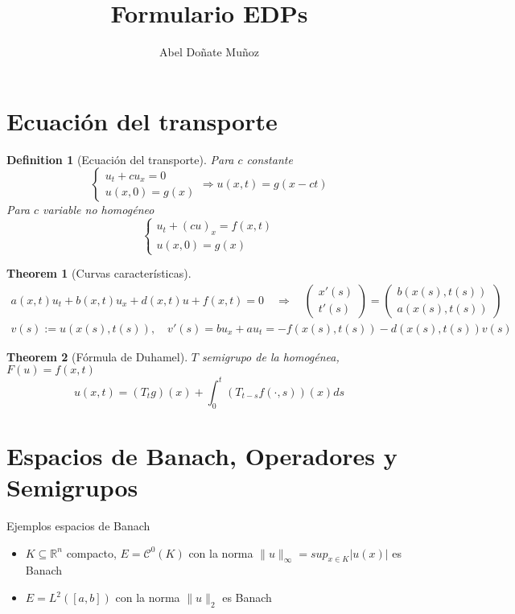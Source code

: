 \documentclass[leqno]{article}
\title{Formulario EDPs}
\author{Abel Doñate Muñoz}
\date{}
\newtheorem*{theorem}{Theorem}
\newtheorem*{definition}{Definition}
\begin{document}
\maketitle
\tableofcontents
\newpage

\section{Ecuación del transporte}

\begin{definition}[Ecuación del transporte]
Para $c$ constante
\[
\begin{cases}
  u_t+cu_x = 0\\ 
  u(x, 0)=g(x)
\end{cases} \Rightarrow u(x,t) = g(x-ct)
\] 
Para $c$ variable no homogéneo
\[
\begin{cases}
  u_t+(cu)_x = f(x,t)\\ 
  u(x, 0)=g(x)
\end{cases} 
\]
\end{definition}

\begin{theorem}[Curvas características]
  \begin{align*}
a(x,t)u_t + b(x,t)u_x + d(x, t)u + f(x,t)=0 \quad \Rightarrow \quad \begin{pmatrix} x'(s)\\ t'(s) \end{pmatrix} = \begin{pmatrix} b(x(s),t(s))\\ a(x(s), t(s)) \end{pmatrix}  \\
v(s) := u(x(s), t(s)), \quad v'(s) = bu_x+au_t = -f(x(s),t(s)) - d(x(s),t(s))v(s)
  \end{align*}
\end{theorem}

\begin{theorem}[Fórmula de Duhamel] $T$ semigrupo de la homogénea, $F(u)=f(x,t)$ 
  \[
  u(x,t) = (T_tg)(x) + \int_0^t (T_{t-s}f(\cdot , s))(x)ds
  \] 
\end{theorem}

\section{Espacios de Banach, Operadores y Semigrupos}
Ejemplos espacios de Banach
\begin{itemize}[topsep=-6pt, itemsep=0pt]
  \item $K\subseteq \mathbb{R}^n$ compacto, $E=\mathcal{C}^0(K)$ con la norma $\|u\|_{\infty}=sup_{x\in K}|u(x)|$ es Banach
  \item $E=L^2([a,b])$ con la norma  $\|u\|_{2}$ es Banach
\end{itemize}
\end{document}
